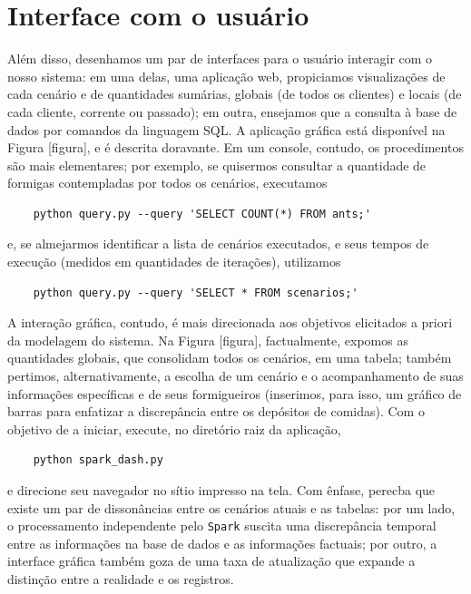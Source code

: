 \documentclass[12pt,oneside,a4paper]{article}
\begin{document}
\section{Interface com o usuário} \label{sec:user} 

Além disso, desenhamos um par de interfaces para o usuário interagir com o nosso sistema: em uma delas, uma aplicação web, propiciamos visualizações de cada cenário e de quantidades sumárias, globais (de todos os clientes) e locais (de cada cliente, corrente ou passado); em outra, ensejamos que a consulta à base de dados por comandos da linguagem SQL. A aplicação gráfica está disponível na Figura [figura], e é descrita doravante. Em um console, contudo, os procedimentos são mais elementares; por exemplo, se quisermos consultar a quantidade de formigas contempladas por todos os cenários, executamos

\begin{lstlisting} 
	python query.py --query 'SELECT COUNT(*) FROM ants;'
\end{lstlisting} 

\noindent e, se almejarmos identificar a lista de cenários executados, e seus tempos de execução (medidos em quantidades de iterações), utilizamos 

\begin{lstlisting} 
	python query.py --query 'SELECT * FROM scenarios;'    
\end{lstlisting} 

A interação gráfica, contudo, é mais direcionada aos objetivos elicitados a priori da modelagem do sistema. Na Figura [figura], factualmente, expomos as quantidades globais, que consolidam todos os cenários, em uma tabela; também pertimos, alternativamente, a escolha de um cenário e o acompanhamento de suas informações específicas e de seus formigueiros (inserimos, para isso, um gráfico de barras para enfatizar a discrepância entre os depósitos de comidas). Com o objetivo de a iniciar, execute, no diretório raiz da aplicação, 

\begin{lstlisting} 
	python spark_dash.py    
\end{lstlisting} 

\noindent e direcione seu navegador no sítio impresso na tela. Com ênfase, perecba que existe um par de dissonâncias entre os cenários atuais e as tabelas: por um lado, o processamento independente pelo \texttt{Spark} suscita uma discrepância temporal entre as informações na base de dados e as informações factuais; por outro, a interface gráfica também goza de uma taxa de atualização que expande a distinção entre a realidade e os registros.  
\end{document}
